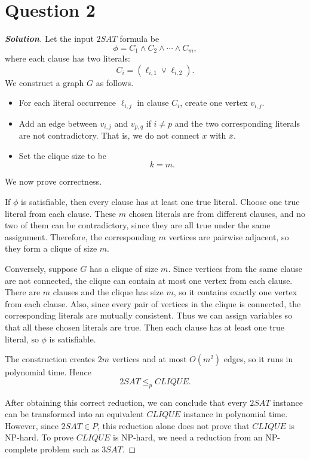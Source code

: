 \documentclass[a4paper, UTF-8]{article}
\theoremstyle{plain}
\newenvironment{solution}{\begin{proof}[\indent\bf Solution]}{\end{proof}}
\begin{document}
\section{Question 2} 

\begin{solution}
Let the input $2SAT$ formula be
\[
  \phi=C_1\wedge C_2\wedge \cdots \wedge C_m,
\]
where each clause has two literals:
\[
  C_i=(\ell_{i,1}\vee \ell_{i,2}).
\]
We construct a graph $G$ as follows.

\begin{itemize}
  \item For each literal occurrence $\ell_{i,j}$ in clause $C_i$, create one
  vertex $v_{i,j}$.
  \item Add an edge between $v_{i,j}$ and $v_{p,q}$ if $i\neq p$ and the two
  corresponding literals are not contradictory. That is, we do not connect
  $x$ with $\bar x$.
  \item Set the clique size to be
  \[
    k=m.
  \]
\end{itemize}

We now prove correctness.

If $\phi$ is satisfiable, then every clause has at least one true literal.
Choose one true literal from each clause. These $m$ chosen literals are from
different clauses, and no two of them can be contradictory, since they are all
true under the same assignment. Therefore, the corresponding $m$ vertices are
pairwise adjacent, so they form a clique of size $m$.

Conversely, suppose $G$ has a clique of size $m$. Since vertices from the same
clause are not connected, the clique can contain at most one vertex from each
clause. There are $m$ clauses and the clique has size $m$, so it contains
exactly one vertex from each clause. Also, since every pair of vertices in the
clique is connected, the corresponding literals are mutually consistent.
Thus we can assign variables so that all these chosen literals are true. Then
each clause has at least one true literal, so $\phi$ is satisfiable.

The construction creates $2m$ vertices and at most $O(m^2)$ edges, so it runs in
polynomial time. Hence
\[
  2SAT\le_p CLIQUE.
\]

After obtaining this correct reduction, we can conclude that every $2SAT$
instance can be transformed into an equivalent $CLIQUE$ instance in polynomial
time. However, since $2SAT\in P$, this reduction alone does not prove that
$CLIQUE$ is NP-hard. To prove $CLIQUE$ is NP-hard, we need a reduction from an
NP-complete problem such as $3SAT$.
\end{solution}
\end{document}
